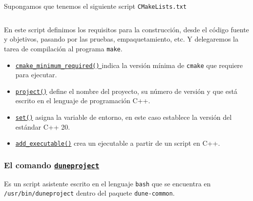 




\begin{frame}[fragile]
	Supongamos que tenemos el siguiente script \texttt{CMakeLists.txt}

	\inputminted{cmake}{CMakeList.txt.sample}

	En este script definimos los requisitos para la construcción, desde
	el código fuente y objetivos, pasando por las pruebas, empaquetamiento, etc.
	Y delegaremos la tarea de compilación al programa \texttt{make}.

	\begin{itemize}
		\item

		\href{https://cmake.org/cmake/help/latest/command/cmake_minimum_required.html}{
			\texttt{cmake_minimum_required()}
		} indica la versión mínima de \texttt{cmake} que requiere para ejecutar.

		\item
		
		\href{https://cmake.org/cmake/help/latest/command/project.html}{\texttt{project()}}
		define el nombre del proyecto, su número de versión y que
		está escrito en el lenguaje de programación C++.
		
		\item

		\href{https://cmake.org/cmake/help/latest/command/set.html}{\texttt{set()}}
		asigna la variable de entorno, en este caso establece la versión del estándar C++ 20.

		\item

		\href{https://cmake.org/cmake/help/latest/command/add_executable.html}{\texttt{add_executable()}}
		crea un ejecutable a partir de un script en C++.
	\end{itemize}
\end{frame}

\begin{frame}
	\frametitle{
		El comando \href{https://gitlab.dune-project.org/core/dune-common/-/raw/master/bin/duneproject}{\texttt{duneproject}}
	}

	Es un script asistente escrito en el lenguaje \texttt{bash}
	que se encuentra en \texttt{/usr/bin/duneproject}
	dentro del paquete \lstinline{dune-common}.
\end{frame}

